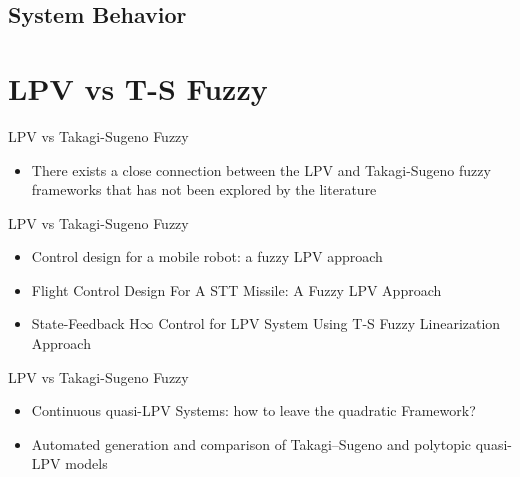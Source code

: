 \subsection{System Behavior}

\section{LPV vs T-S Fuzzy}
\begin{frame}{LPV vs Takagi-Sugeno Fuzzy}
    \begin{itemize}
        \item There exists a close connection between the LPV and Takagi-Sugeno fuzzy frameworks \autocite{Rotondo2018} that has not been explored by the literature
    \end{itemize}
\end{frame}

\begin{frame}{LPV vs Takagi-Sugeno Fuzzy}
    \begin{itemize}
        \item Control design for a mobile robot: a fuzzy LPV approach \autocite{Tsourdos}
        
        \item Flight Control Design For A STT Missile: A Fuzzy LPV Approach \autocite{Blumel2017}
        
        \item State-Feedback H$\infty$ Control for LPV System Using T-S Fuzzy Linearization Approach \autocite{Liu2013}
    \end{itemize}
\end{frame}

\begin{frame}{LPV vs Takagi-Sugeno Fuzzy}
    \begin{itemize}
    
    \item Continuous quasi-LPV Systems: how to leave the quadratic Framework? \autocite{JAADARI2013}
        
        \item Automated generation and comparison of Takagi–Sugeno and polytopic quasi-LPV models \autocite{Rotondo2015}
    \end{itemize}
\end{frame}

